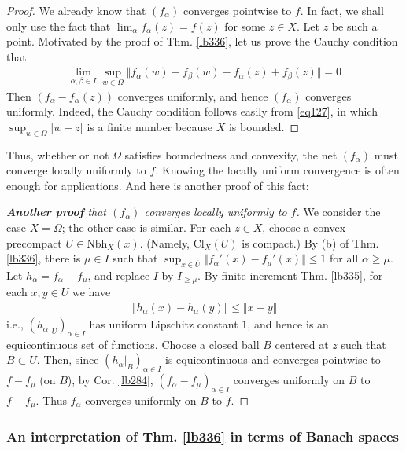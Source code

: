 \documentclass[12pt,b5paper,notitlepage]{article}
\theoremstyle{definition}
\theoremstyle{plain}
\newcommand{\ovl}{\overline}
\newcommand{\Nbh}{\mathrm{Nbh}}
\newcommand{\Cl}{\mathrm{Cl}}
\numberwithin{equation}{section}
\begin{document}
\begin{proof}
We already know that $(f_\alpha)$ converges pointwise to $f$. In fact, we shall only use the fact that $\lim_\alpha f_\alpha(z)=f(z)$  for some $z\in X$. Let $z$ be such a point. Motivated by the proof of Thm. \ref{lb336}, let us prove  the Cauchy condition that
\begin{align*}
\lim_{\alpha,\beta\in I}\sup_{w\in\Omega}\Vert f_\alpha(w)-f_\beta(w)-f_\alpha(z)+f_\beta(z)\Vert=0
\end{align*}
Then $(f_\alpha-f_\alpha(z))$ converges uniformly, and hence $(f_\alpha)$ converges uniformly. Indeed, the Cauchy condition follows easily from \eqref{eq127}, in which $\sup_{w\in\Omega}|w-z|$ is a finite number because $X$ is bounded.
\end{proof}


Thus, whether or not $\Omega$ satisfies boundedness and convexity, the net $(f_\alpha)$ must converge locally uniformly to $f$. Knowing the locally uniform convergence is often enough for applications. And here is another proof of this fact:

\begin{proof}[\textbf{Another proof} that $(f_\alpha)$ converges locally uniformly to $f$]
We consider the case $X=\Omega$; the other case is similar. For each $z\in X$, choose a convex precompact $U\in\Nbh_X(x)$. (Namely, $\Cl_X(U)$ is compact.) By (b) of Thm. \ref{lb336}, there is $\mu\in I$ such that $\sup_{x\in\ovl U}\Vert f_\alpha'(x)-f_\mu'(x)\Vert\leq 1$ for all $\alpha\geq\mu$. Let $h_\alpha=f_\alpha-f_\mu$, and replace $I$ by $I_{\geq\mu}$. By finite-increment Thm. \ref{lb335}, for each $x,y\in U$ we have
\begin{align*}
\Vert h_\alpha(x)-h_\alpha(y)\Vert\leq \Vert x-y\Vert
\end{align*}
i.e., $(h_\alpha|_U)_{\alpha\in I}$ has uniform Lipschitz constant $1$, and hence is an equicontinuous set of functions. Choose a closed ball $B$ centered at $z$ such that $B\subset U$. Then, since $(h_\alpha|_B)_{\alpha\in I}$ is equicontinuous and converges pointwise to $f-f_\mu$ (on $B$), by Cor. \ref{lb284}, $(f_\alpha-f_\mu)_{\alpha\in I}$ converges uniformly on $B$ to $f-f_\mu$. Thus $f_\alpha$ converges uniformly on $B$ to $f$.
\end{proof}



\subsubsection{An interpretation of Thm. \ref{lb336} in terms of Banach spaces}
\end{document}
